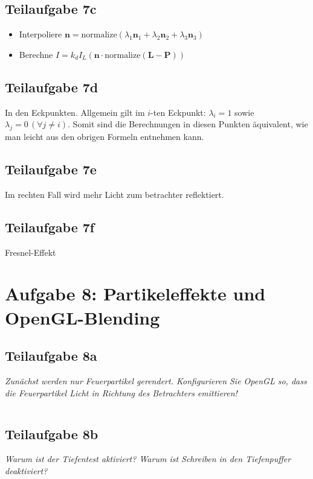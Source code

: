 \documentclass[a4paper]{scrartcl}
\begin{document}
\subsection*{Teilaufgabe 7c}
\begin{itemize}
    \item Interpoliere $\mathbf{n} = \text{normalize}(\lambda_1 \mathbf{n}_1 + \lambda_2 \mathbf{n}_2 + \lambda_3 \mathbf{n}_3)$
    \item Berechne $I = k_d I_L (\mathbf{n} \cdot \text{normalize}(\mathbf{L}-\mathbf{P}))$
\end{itemize}

\subsection*{Teilaufgabe 7d}
In den Eckpunkten. Allgemein gilt im $i$-ten Eckpunkt: $\lambda_i = 1$ sowie $\lambda_j = 0 \, (\forall j \neq i)$.
Somit sind die Berechnungen in diesen Punkten äquivalent, wie man leicht aus den obrigen Formeln entnehmen kann.

\subsection*{Teilaufgabe 7e}
Im rechten Fall wird mehr Licht zum betrachter reflektiert.

\subsection*{Teilaufgabe 7f}
Fresnel-Effekt

\clearpage
\section*{Aufgabe 8: Partikeleffekte und OpenGL-Blending}
\subsection*{Teilaufgabe 8a}
\textit{Zunächst werden nur Feuerpartikel gerendert. Konfigurieren Sie OpenGL
so, dass die Feuerpartikel Licht in Richtung des Betrachters emittieren!}

\inputminted[linenos, numbersep=5pt, tabsize=4, frame=lines, label=8a.cpp]{cpp}{8a.cpp}

\subsection*{Teilaufgabe 8b}
\textit{Warum ist der Tiefentest aktiviert? Warum ist Schreiben in den
Tiefenpuffer deaktiviert?}
\end{document}
